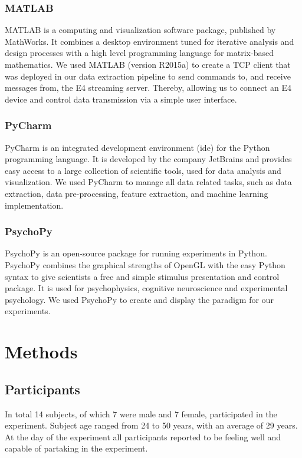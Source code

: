 \subsubsection{MATLAB}
MATLAB is a computing and visualization software package, published by MathWorks. It combines a desktop environment tuned for iterative analysis and design processes with a high level programming language for matrix-based mathematics. We used MATLAB (version R2015a) to create a TCP client that was deployed in our data extraction pipeline to send commands to, and receive messages from, the E4 streaming server. Thereby, allowing us to connect an E4 device and control data transmission via a simple user interface.
\subsubsection{PyCharm}
PyCharm is an integrated development environment (\gls{ide}) for the Python programming language. It is developed by the company JetBrains and provides easy access to a large collection of scientific tools, used for data analysis and visualization. We used PyCharm to manage all data related tasks, such as data extraction, data pre-processing, feature extraction, and machine learning implementation. 

\subsubsection{PsychoPy}
PsychoPy is an open-source package for running experiments in Python. PsychoPy combines the graphical strengths of OpenGL with the easy Python syntax to give scientists a free and simple stimulus presentation and control package. It is used for psychophysics, cognitive neuroscience and experimental psychology. We used PsychoPy to create and display the paradigm for our experiments.
\section{Methods}

\subsection{Participants}
In total 14 subjects, of which 7 were male and 7 female, participated in the experiment. Subject age ranged from 24 to 50 years, with an average of 29 years. At the day of the experiment all participants reported to be feeling well and capable of partaking in the experiment. 
